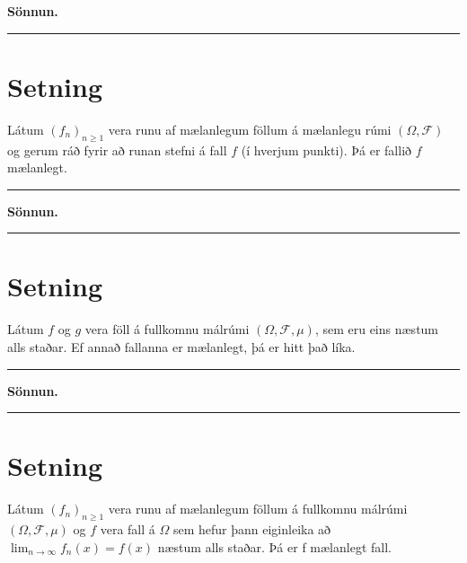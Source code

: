 \documentclass[]{book}
\begin{document}
\textbf{Sönnun.}

\begin{center}\rule{0.5\linewidth}{\linethickness}\end{center}

\hypertarget{setning-37}{%
\section{Setning}\label{setning-37}}

Látum \((f_n)_{n\geq1}\) vera runu af mælanlegum föllum á mælanlegu rúmi \((\Omega, \mathcal F)\) og gerum ráð fyrir að runan stefni á fall \(f\) (í hverjum punkti). Þá er fallið \(f\) mælanlegt.

\begin{center}\rule{0.5\linewidth}{\linethickness}\end{center}

\textbf{Sönnun.}

\begin{center}\rule{0.5\linewidth}{\linethickness}\end{center}

\hypertarget{setning-38}{%
\section{Setning}\label{setning-38}}

Látum \(f\) og \(g\) vera föll á fullkomnu málrúmi \((\Omega, \mathcal F, \mu)\), sem eru eins næstum alls staðar. Ef annað fallanna er mælanlegt, þá er hitt það líka.

\begin{center}\rule{0.5\linewidth}{\linethickness}\end{center}

\textbf{Sönnun.}

\begin{center}\rule{0.5\linewidth}{\linethickness}\end{center}

\hypertarget{setning-39}{%
\section{Setning}\label{setning-39}}

Látum \((f_n)_{n\geq1}\) vera runu af mælanlegum föllum á fullkomnu málrúmi \((\Omega, \mathcal F, \mu)\) og \(f\) vera fall á \(\Omega\) sem hefur þann eiginleika að \(\lim_{n\rightarrow\infty} f_n(x) = f(x)\) næstum alls staðar. Þá er f mælanlegt fall.
\end{document}

